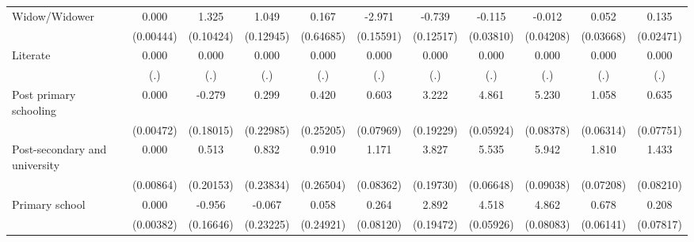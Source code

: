 {\begin{tabular}{l*{10}{c}}
Widow/Widower       &       0.000         &       1.325\sym{***}&       1.049\sym{***}&       0.167         &      -2.971\sym{***}&      -0.739\sym{***}&      -0.115\sym{**} &      -0.012         &       0.052         &       0.135\sym{***}\\
                    &   (0.00444)         &   (0.10424)         &   (0.12945)         &   (0.64685)         &   (0.15591)         &   (0.12517)         &   (0.03810)         &   (0.04208)         &   (0.03668)         &   (0.02471)         \\
Literate            &       0.000         &       0.000         &       0.000         &       0.000         &       0.000         &       0.000         &       0.000         &       0.000         &       0.000         &       0.000         \\
                    &         (.)         &         (.)         &         (.)         &         (.)         &         (.)         &         (.)         &         (.)         &         (.)         &         (.)         &         (.)         \\
Post primary schooling&       0.000         &      -0.279         &       0.299         &       0.420         &       0.603\sym{***}&       3.222\sym{***}&       4.861\sym{***}&       5.230\sym{***}&       1.058\sym{***}&       0.635\sym{***}\\
                    &   (0.00472)         &   (0.18015)         &   (0.22985)         &   (0.25205)         &   (0.07969)         &   (0.19229)         &   (0.05924)         &   (0.08378)         &   (0.06314)         &   (0.07751)         \\
Post-secondary and university&       0.000         &       0.513\sym{*}  &       0.832\sym{***}&       0.910\sym{***}&       1.171\sym{***}&       3.827\sym{***}&       5.535\sym{***}&       5.942\sym{***}&       1.810\sym{***}&       1.433\sym{***}\\
                    &   (0.00864)         &   (0.20153)         &   (0.23834)         &   (0.26504)         &   (0.08362)         &   (0.19730)         &   (0.06648)         &   (0.09038)         &   (0.07208)         &   (0.08210)         \\
Primary school      &       0.000         &      -0.956\sym{***}&      -0.067         &       0.058         &       0.264\sym{**} &       2.892\sym{***}&       4.518\sym{***}&       4.862\sym{***}&       0.678\sym{***}&       0.208\sym{**} \\
                    &   (0.00382)         &   (0.16646)         &   (0.23225)         &   (0.24921)         &   (0.08120)         &   (0.19472)         &   (0.05926)         &   (0.08083)         &   (0.06141)         &   (0.07817)         \\

\end{tabular}}
